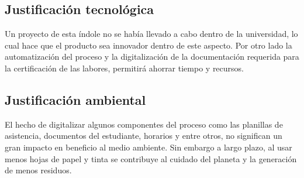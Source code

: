 \subsection{Justificación tecnológica}
Un proyecto de esta índole no se había llevado a cabo dentro de la universidad, lo cual hace que el producto sea innovador dentro de este aspecto. Por otro lado la automatización del proceso y la digitalización de la documentación requerida para la certificación de las labores, permitirá ahorrar tiempo y recursos.
\subsection{Justificación ambiental}
El hecho de digitalizar algunos componentes del proceso como las planillas de asistencia, documentos del estudiante, horarios y entre otros, no significan un gran impacto en beneficio al medio ambiente. Sin embargo a largo plazo, al usar menos hojas de papel y tinta se contribuye al cuidado del planeta y la generación de menos residuos.